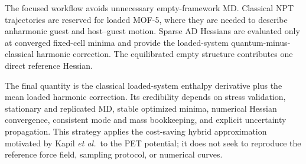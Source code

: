 \documentclass[10pt,a4paper,twocolumn]{article}
\begin{document}
The focused workflow avoids unnecessary empty-framework MD. Classical NPT
trajectories are reserved for loaded MOF-5, where they are needed to describe
anharmonic guest and host--guest motion. Sparse AD Hessians are evaluated only
at converged fixed-cell minima and provide the loaded-system
quantum-minus-classical harmonic correction. The equilibrated empty structure
contributes one direct reference Hessian.

The final quantity is the classical loaded-system enthalpy derivative plus the
mean loaded harmonic correction. Its credibility depends on stress validation,
stationary and replicated MD, stable optimized minima, numerical Hessian
convergence, consistent mode and mass bookkeeping, and explicit uncertainty
propagation. This strategy applies the cost-saving hybrid approximation
motivated by Kapil \emph{et al.}\ to the PET potential; it does not seek to
reproduce the reference force field, sampling protocol, or numerical curves.
\end{document}
